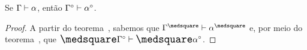     \begin{theorem}
        Se $\Gamma\mathrel{\vdash}\alpha$, então $\Gamma^\circ\mathrel{\vdash}\alpha^\circ$.

        \begin{proof}
            A partir do teorema~, sabemos que $\Gamma^\medsquare\entails\alpha^\medsquare$ e, por meio do teorema~, que $\nec\Gamma^\circ\entails\nec\alpha^\circ$.
        \end{proof}
    \end{theorem}